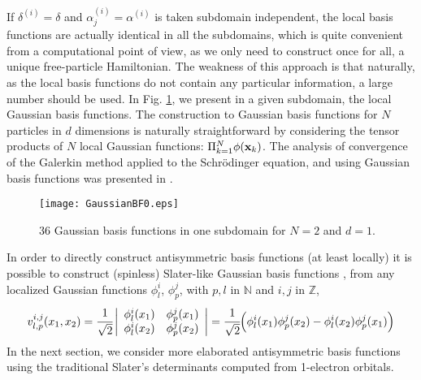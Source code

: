\documentclass[11pt]{elsarticle}
\newcommand{\Z} {\ensuremath{\mathbb{Z}}}
\newcommand{\N} {\ensuremath{\mathbb{N}}}
\begin{document}
If $\delta^{(i)}=\delta$ and $\alpha_j^{(i)}=\alpha^{(i)}$ is taken subdomain independent, the local basis functions are actually identical in all the subdomains, which is quite convenient from a computational point of view, as we only need to construct once for all, a unique free-particle Hamiltonian. The weakness of this approach is that naturally, as the local basis functions do not contain any particular information, a large number should be used. In Fig. \ref{GBF0}, we present in a given subdomain, the local Gaussian basis functions. The construction to Gaussian basis functions for $N$ particles in $d$ dimensions is naturally straightforward by considering the tensor products of $N$ local Gaussian functions: $\Pi_{k=1}^N\phi({\bf x}_k)$. The analysis of convergence of the Galerkin method applied to the Schr\"odinger equation, and using Gaussian basis functions was presented in \cite{GalerSchro}.\\
\begin{figure}[!ht]
\begin{center}
\hspace*{1mm}\texttt{[image: GaussianBF0.eps]}
\caption{$36$ Gaussian basis functions in one subdomain for $N=2$ and $d=1$.}
\label{GBF0}
\end{center}
\end{figure}
In order to directly construct antisymmetric basis functions (at least locally) it is possible to construct (spinless) Slater-like Gaussian basis functions \cite{ostlund}, from any localized Gaussian functions $\phi^i_l$, $\phi_p^j$, with $p,l$ in $\N$ and $i,j$ in $\Z$,
\begin{eqnarray}\label{LSD}
v_{l,p}^{i,j}(x_1,x_2) = 
\cfrac{1}{\sqrt{2}}\left|
\begin{array}{cc}
\phi^i_l(x_1) & \phi^j_p(x_1) \\
\phi^i_l(x_2) & \phi^j_p(x_2) 
\end{array}
\right| = \cfrac{1}{\sqrt{2}}\Big(\phi_l^i(x_1)\phi_p^j(x_2) -\phi_l^i(x_2)\phi_p^j(x_1)\Big)
\end{eqnarray}
In the next section, we consider more elaborated antisymmetric basis functions using the traditional Slater's determinants computed from 1-electron orbitals.
\end{document}
